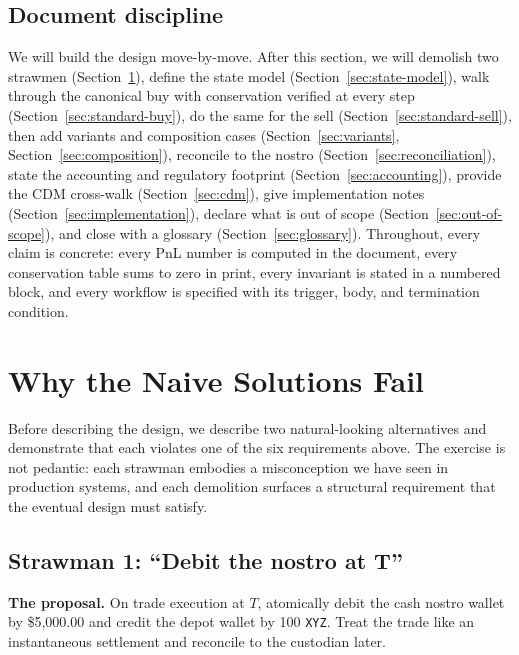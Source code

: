 \documentclass[11pt,a4paper]{article}
\begin{document}
\subsection{Document discipline}

We will build the design move-by-move. After this section, we will demolish two strawmen (Section~\ref{sec:strawmen}), define the state model (Section~\ref{sec:state-model}), walk through the canonical buy with conservation verified at every step (Section~\ref{sec:standard-buy}), do the same for the sell (Section~\ref{sec:standard-sell}), then add variants and composition cases (Section~\ref{sec:variants}, Section~\ref{sec:composition}), reconcile to the nostro (Section~\ref{sec:reconciliation}), state the accounting and regulatory footprint (Section~\ref{sec:accounting}), provide the CDM cross-walk (Section~\ref{sec:cdm}), give implementation notes (Section~\ref{sec:implementation}), declare what is out of scope (Section~\ref{sec:out-of-scope}), and close with a glossary (Section~\ref{sec:glossary}). Throughout, every claim is concrete: every PnL number is computed in the document, every conservation table sums to zero in print, every invariant is stated in a numbered block, and every workflow is specified with its trigger, body, and termination condition.

\clearpage
\section{Why the Naive Solutions Fail}
\label{sec:strawmen}

Before describing the design, we describe two natural-looking alternatives and demonstrate that each violates one of the six requirements above. The exercise is not pedantic: each strawman embodies a misconception we have seen in production systems, and each demolition surfaces a structural requirement that the eventual design must satisfy.

\subsection{Strawman 1: ``Debit the nostro at T''}
\label{sec:strawman-1}

\textbf{The proposal.} On trade execution at $T$, atomically debit the cash nostro wallet by \$5{,}000.00 and credit the depot wallet by 100 \texttt{XYZ}. Treat the trade like an instantaneous settlement and reconcile to the custodian later.
\end{document}
